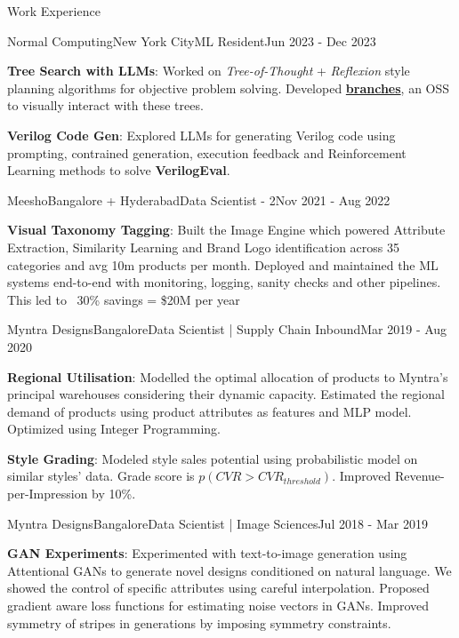 \documentclass{resume} %
\begin{document}
\begin{rSection}{Work Experience}
\begin{rSubsection}{Normal Computing}{New York City}{ML Resident}{Jun 2023 - Dec 2023}

\item \textbf{Tree Search with LLMs}: Worked on {\it Tree-of-Thought} + {\it Reflexion} style planning algorithms for objective problem solving. Developed \href{https://github.com/normal-computing/branches}{\textbf{branches}}, an OSS to visually interact with these trees.
\item \textbf{Verilog Code Gen}: Explored LLMs for generating Verilog code using prompting, contrained generation, execution feedback and Reinforcement Learning methods to solve \textbf{VerilogEval}.
\end{rSubsection}

\begin{rSubsection}{Meesho}{Bangalore + Hyderabad}{Data Scientist - 2}{Nov 2021 - Aug 2022}

\item \textbf{Visual Taxonomy Tagging}: Built the Image Engine which powered Attribute Extraction, Similarity Learning and Brand Logo identification across 35 categories and avg 10m products per month. Deployed and maintained the ML systems end-to-end with monitoring, logging, sanity checks and other pipelines. This led to  ~30\%  savings = \$20M per year
\end{rSubsection}


\begin{rSubsection}{Myntra Designs}{Bangalore}{Data Scientist | Supply Chain Inbound}{Mar 2019 - Aug 2020}
\item \textbf{Regional Utilisation}: Modelled the optimal allocation of products to Myntra's principal warehouses considering their dynamic capacity. Estimated the regional demand of products using product attributes as features and MLP model. Optimized using Integer Programming.
\item \textbf{Style Grading}: Modeled style sales potential using probabilistic model on similar styles' data. Grade score is $p(CVR > CVR_{threshold})$. Improved Revenue-per-Impression by 10\%.

\end{rSubsection}

\begin{rSubsection}{Myntra Designs}{Bangalore}{Data Scientist | Image Sciences}{Jul 2018 - Mar 2019}

\item \textbf{GAN Experiments}: Experimented with text-to-image generation using Attentional GANs to generate novel designs conditioned on natural language. We showed the control of specific attributes using careful interpolation. Proposed gradient aware loss functions for estimating noise vectors in GANs. Improved symmetry of stripes in generations by imposing symmetry constraints.
\end{rSubsection}
\end{rSection}
\end{document}
